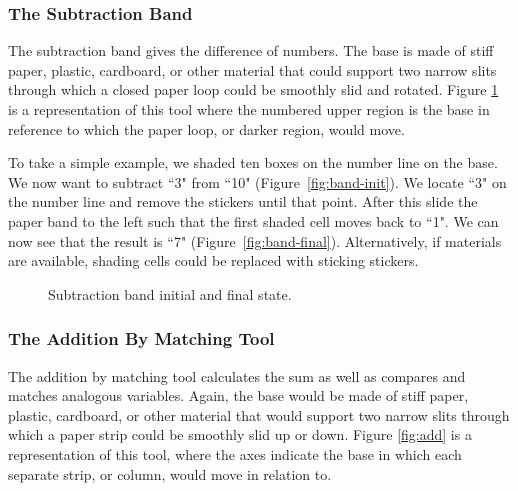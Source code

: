 \documentclass{sig-alternate}
\begin{document}
\subsubsection{The Subtraction Band}

The subtraction band gives the difference of numbers. The base is made of stiff paper, plastic, cardboard, or other material that could support two narrow slits through which a closed paper loop could be smoothly slid and rotated. Figure \ref{fig:band} is a representation of this tool where the numbered upper region is the base in reference to which the paper loop, or darker region, would move.

To take a simple example, we shaded ten boxes on the number line on the base. We now want to subtract ``3" from ``10" (Figure~\ref{fig:band-init}). We locate ``3" on the number line and remove the stickers until that point. After this slide the paper band to the left such that the first shaded cell moves back to ``1". We can now see that the result is ``7" (Figure~\ref{fig:band-final}). Alternatively, if materials are available, shading cells could be replaced with sticking stickers.

\begin{figure}%
    \centering
    \qquad
    \caption{Subtraction band initial and final state.}%
    \label{fig:band}%
\end{figure}

\subsubsection{The Addition By Matching Tool}

The addition by matching tool calculates the sum as well as compares and matches analogous variables. Again, the base would be made of stiff paper, plastic, cardboard, or other material that would support two narrow slits through which a paper strip could be smoothly slid up or down. Figure \ref{fig:add} is a representation of this tool, where the axes indicate the base in which each separate strip, or column, would move in relation to.
\end{document}
